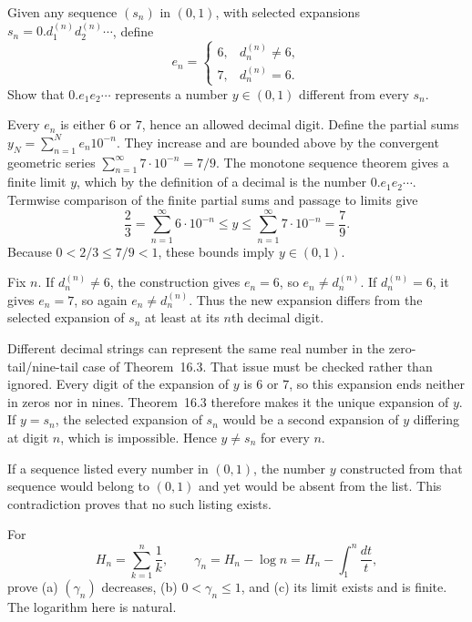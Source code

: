 \goal Given any sequence $(s_n)$ in $(0,1)$, with selected
expansions $s_n=0.d_1^{(n)}d_2^{(n)}\cdots$, define
\[
 e_n=\begin{cases}
 6,&d_n^{(n)}\ne6,\\
 7,&d_n^{(n)}=6.
 \end{cases}
\]
Show that $0.e_1e_2\cdots$ represents a number $y\in(0,1)$
different from every $s_n$.

Every $e_n$ is either $6$ or $7$, hence an allowed decimal digit.
Define the partial sums $y_N=\sum_{n=1}^{N}e_n10^{-n}$.
They increase and are bounded above by the convergent geometric
series $\sum_{n=1}^{\infty}7\cdot10^{-n}=7/9$.
The monotone sequence theorem gives a finite limit $y$, which
by the definition of a decimal is the number $0.e_1e_2\cdots$.
Termwise comparison of the finite partial sums and passage to
limits give
\[
 \frac23=\sum_{n=1}^{\infty}6\cdot10^{-n}
 \le y\le\sum_{n=1}^{\infty}7\cdot10^{-n}=\frac79.
\]
Because $0<2/3\le7/9<1$, these bounds imply $y\in(0,1)$.

Fix $n$. If $d_n^{(n)}\ne6$, the construction gives $e_n=6$,
so $e_n\ne d_n^{(n)}$. If $d_n^{(n)}=6$, it gives $e_n=7$,
so again $e_n\ne d_n^{(n)}$.
Thus the new expansion differs from the selected expansion of
$s_n$ at least at its $n$th decimal digit.

Different decimal strings can represent the same real number in
the zero-tail/nine-tail case of Theorem~16.3. That issue must be
checked rather than ignored. Every digit of the expansion of $y$
is $6$ or $7$, so this expansion ends neither in zeros nor in
nines. Theorem~16.3 therefore makes it the unique expansion of
$y$. If $y=s_n$, the selected expansion of $s_n$ would be a
second expansion of $y$ differing at digit $n$, which is impossible.
Hence $y\ne s_n$ for every $n$.

If a sequence listed every number in $(0,1)$, the number $y$
constructed from that sequence would belong to $(0,1)$ and yet
would be absent from the list. This contradiction proves that
no such listing exists.

\goal For
\[
 H_n=\sum_{k=1}^{n}\frac1k,\qquad
 \gamma_n=H_n-\log n
 =H_n-\int_1^n\frac{dt}{t},
\]
prove (a) $(\gamma_n)$ decreases, (b) $0<\gamma_n\le1$, and
(c) its limit exists and is finite. The logarithm here is natural.

